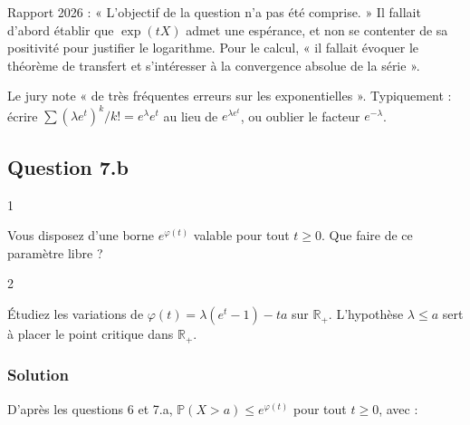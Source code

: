 \documentclass[11pt,a4paper]{article}
\newcommand{\equationajustee}[1]{%
  \sbox{\boiteequation}{$\displaystyle #1$}%
  \ifdim\wd\boiteequation>\linewidth
    \[\resizebox{\linewidth}{!}{\usebox{\boiteequation}}\]%
  \else
    \[#1\]%
  \fi}
\begin{document}
\equationajustee{\boxed{\psi(t)=\lambda\,(e^t-1).}}

\begin{jury}

Rapport 2026 : « L'objectif de la question n'a pas été comprise. » Il fallait d'abord établir que \(\exp(tX)\) admet une espérance, et non se contenter de sa positivité pour justifier le logarithme. Pour le calcul, « il fallait évoquer le théorème de transfert et s'intéresser à la convergence absolue de la série ».

\end{jury}

\begin{piege}

Le jury note « de très fréquentes erreurs sur les exponentielles ». Typiquement : écrire \(\sum(\lambda e^t)^k/k!=e^\lambda e^t\) au lieu de \(e^{\lambda e^t}\), ou oublier le facteur \(e^{-\lambda}\).

\end{piege}

\hypertarget{question-7.b}{%
\subsection{Question 7.b}\label{question-7.b}}

\begin{indication}{1}

Vous disposez d'une borne \(e^{\varphi(t)}\) valable pour tout \(t\ge0\). Que faire de ce paramètre libre ?

\end{indication}

\begin{indication}{2}

Étudiez les variations de \(\varphi(t)=\lambda(e^t-1)-ta\) sur \(\mathbb R_+\). L'hypothèse \(\lambda\le a\) sert à placer le point critique dans \(\mathbb R_+\).

\end{indication}

\hypertarget{solution-7}{%
\subsubsection{Solution}\label{solution-7}}

D'après les questions 6 et 7.a, \(\mathbb P(X>a)\le e^{\varphi(t)}\) pour tout \(t\ge0\), avec :

\equationajustee{\varphi(t)=\lambda(e^t-1)-ta .}
\end{document}
